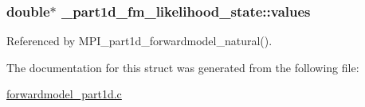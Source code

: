 \subsubsection[{\texorpdfstring{values}{values}}]{\setlength{\rightskip}{0pt plus 5cm}double$\ast$ \+\_\+part1d\+\_\+fm\+\_\+likelihood\+\_\+state\+::values}\hypertarget{struct__part1d__fm__likelihood__state_a7aef3ab9c718c1e724355a916bedb75c}{}\label{struct__part1d__fm__likelihood__state_a7aef3ab9c718c1e724355a916bedb75c}


Referenced by M\+P\+I\+\_\+part1d\+\_\+forwardmodel\+\_\+natural().



The documentation for this struct was generated from the following file\+:\begin{DoxyCompactItemize}
\item 
\hyperlink{forwardmodel__part1d_8c}{forwardmodel\+\_\+part1d.\+c}\end{DoxyCompactItemize}
